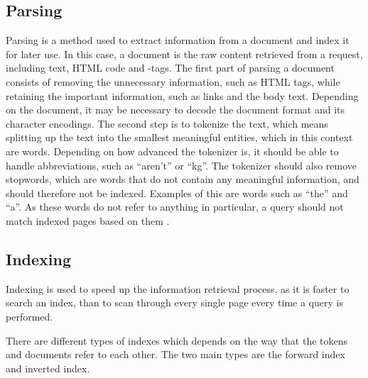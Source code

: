 \subsection{Parsing} \label{sec:parsing}
Parsing is a method used to extract information from a document and index it for
later use. In this case, a document is the raw content retrieved from a request,
including text, HTML code and -tags.
The first part of parsing a document consists of removing the unnecessary
information, such as HTML tags, while retaining the important information, such
as links and the body text. Depending on the document, it may be necessary to
decode the document format and its character encodings.
The second step is to tokenize the text, which means splitting up the text into
the smallest meaningful entities, which in this context are words. Depending on
how advanced the tokenizer is, it should be able to handle abbreviations, such
as ``aren't'' or ``kg''. The tokenizer should also remove
stopwords, which are words that do not contain any meaningful information,
and should therefore not be indexed. Examples of this are words such as ``the''
and ``a''. As these words do not refer to anything in particular, a query should
not match indexed pages based on them \citep[Ch. 2]{manning2008introduction}.

\subsection{Indexing}
Indexing is used to speed up the information retrieval process, as it is faster
to search an index, than to scan through every single page every time a query is
performed.

There are different types of indexes which depends on the way that the tokens
and documents refer to each other. The two main types are the forward index and
inverted index.

